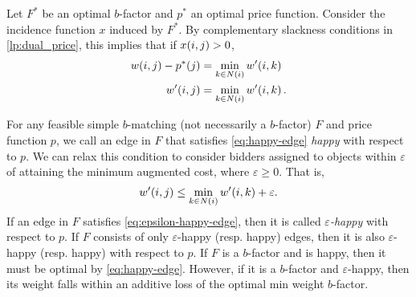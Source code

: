 Let $F^{\ast}$ be an optimal $b$-factor and $p^{\ast}$ an optimal price function. Consider the incidence function $x$ induced by $F^{\ast}$. 
By complementary slackness conditions in \cref{lp:dual_price}, this implies that if $\f[x]{i, j} > 0$,
\begin{equation}
    \begin{aligned}
        \f[w]{i, j} - \f[p^{\ast}]{j} &= \min_{k \in N(i)} \f[w^\prime]{i, k}\\
        \f[w^\prime]{i, j} &= \min_{k \in N(i)} \f[w^\prime]{i, k}. 
    \end{aligned}
    \label{eq:happy-edge} 
\end{equation}
\begin{comment}
Since these are primal and dual optimal, respectively, by strong duality
\begin{align*}
    \sum_{(i, j) \in F^{\ast}} \f[w]{i, j} &= \sum_{j \in R}  \f[b]{j} \f[p^{\ast}]{j} +  \sum_{i \in L}  \f[b]{i} \min_{k \in N(i)} \f[w^\prime]{i, k}\\
    \sum_{(i, j) \in F^{\ast}} \f[w]{i, j} - \f[p^{\ast}]{j} &= \sum_{i \in L}  \f[b]{i} \min_{k \in N(i)} \f[w^\prime]{i, k}\\
    \sum_{(i, j) \in F^{\ast}} \f[w^\prime]{i, j} &= \sum_{i \in L}  \f[b]{i} \min_{k \in N(i)} \f[w^\prime]{i, k}
\end{align*}
which implies that for all $\lrp{i, j} \in F^{\ast}$,
\begin{equation}
    \f[w^\prime]{i, j} =  \min_{k \in N(i)} \f[w^\prime]{i, k}. 
    \label{eq:happy-edge}
\end{equation}
\end{comment}
For any feasible simple $b$-matching (not necessarily a $b$-factor) $F$ and price function $p$, we call an edge in $F$ that satisfies \cref{eq:happy-edge} \emph{happy} with respect to $p$. 
We can relax this condition to consider bidders assigned to objects within $\varepsilon$ of attaining the minimum augmented cost, where $\varepsilon \geq 0$. That is,
\begin{equation}
    \f[w^\prime]{i, j} \leq \min_{k \in N(i)} \f[w^\prime]{i, k} + \varepsilon. 
    \label{eq:epsilon-happy-edge}
\end{equation}
If an edge in $F$ satisfies \cref{eq:epsilon-happy-edge}, then it is called \emph{$\varepsilon$-happy} with respect to $p$. 
If $F$ consists of only $\varepsilon$-happy (resp.\! happy) edges, then it is also $\varepsilon$-happy (resp.\! happy) with respect to $p$. If $F$ is a $b$-factor and is happy, then it must be optimal by \cref{eq:happy-edge}. 
However, if it is a $b$-factor and $\varepsilon$-happy, then its weight falls within an additive loss of the optimal min weight $b$-factor.  

